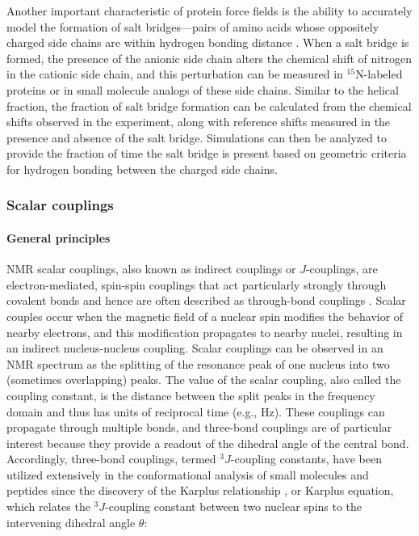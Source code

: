 \documentclass[9pt,review,pubversion]{livecoms}
\begin{document}
Another important characteristic of protein force fields is the ability to accurately model the formation of salt bridges---pairs of amino acids whose oppositely charged side chains are within hydrogen bonding distance \cite{donald_salt_2011}.
When a salt bridge is formed, the presence of the anionic side chain alters the chemical shift of nitrogen in the cationic side chain, and this perturbation can be measured in $^{15}$N-labeled proteins \cite{tomlinson2009characterization} or in small molecule analogs of these side chains.
Similar to the helical fraction, the fraction of salt bridge formation can be calculated from the chemical shifts observed in the experiment, along with reference shifts measured in the presence and absence of the salt bridge.
Simulations can then be analyzed to provide the fraction of time the salt bridge is present based on geometric criteria for hydrogen bonding between the charged side chains.

\subsubsection{Scalar couplings}
\label{sub2:j_coupling}

\paragraph{General principles}

NMR scalar couplings, also known as indirect couplings or $J$-couplings, are electron-mediated, spin-spin couplings that act particularly strongly through covalent bonds and hence are often described as through-bond couplings \cite{karplus_contact_1959,karplus_vicinal_1963}.
Scalar couples occur when the magnetic field of a nuclear spin modifies the behavior of nearby electrons, and this modification propagates to nearby nuclei, resulting in an indirect nucleus-nucleus coupling.
Scalar couplings can be observed in an NMR spectrum as the splitting of the resonance peak of one nucleus into two (sometimes overlapping) peaks.
The value of the scalar coupling, also called the coupling constant, is the distance between the split peaks in the frequency domain and thus has units of reciprocal time (e.g., Hz).
These couplings can propagate through multiple bonds, and three-bond couplings are of particular interest because they provide a readout of the dihedral angle of the central bond. Accordingly, three-bond couplings, termed $^3J$-coupling constants, have been utilized extensively in the conformational analysis of small molecules \cite{karplus_vicinal_1963} and peptides \cite{bystrov_spinspin_1976} since the discovery of the Karplus relationship \cite{karplus_contact_1959}, or Karplus equation, which relates the $^3J$-coupling constant between two nuclear spins to the intervening dihedral angle $\theta$:
\end{document}
